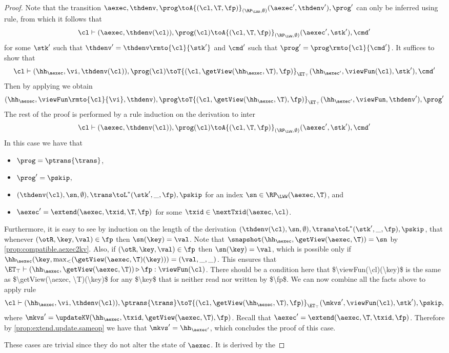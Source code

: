\begin{proof}
Note that the transition 
$\aexec, \thdenv, \prog \toA{(\cl, \T, \fp)}_{(\RP_{\LWW}, \emptyset)} (\aexec', \thdenv'), \prog'$ 
can only be inferred using  rule, 
from which it follows that 
\[
    \cl \vdash (\aexec, \thdenv(\cl)), \prog(\cl) 
    \toA{(\cl, \T, \fp)}_{(\RP_{\LWW}, \emptyset)} (\aexec' ,\stk'), \cmd'
\]
for some $\stk'$ such that $\thdenv' = \thdenv\rmto{\cl}{\stk'}$ 
and $\cmd'$ such that $\prog' = \prog\rmto{\cl}{\cmd'}$.
It suffices to show that 
\[
    \cl \vdash (\hh_\aexec, \vi, \thdenv(\cl)), \prog(\cl) 
   \toT{(\cl, \getView(\hh_{\aexec}, \T), \fp)}_{\ET_{\top}} 
    (\hh_{\aexec'}, \viewFun(\cl), \stk'), \cmd'
\]
Then by applying  we obtain 
\[
    (\hh_{\aexec}, \viewFun\rmto{\cl}{\vi}, \thdenv), \prog 
    \toT{(\cl, \getView(\hh_{\aexec}, \T), \fp)}_{\ET_{\top}} 
    (\hh_{\aexec'}, \viewFun, \thdenv'), \prog'
\]
The rest of the proof is performed by a rule induction on the derivation to inter 
\[ 
    \cl \vdash (\aexec, \thdenv(\cl)), \prog(\cl) 
    \toA{(\cl, \T, \fp)}_{(\RP_{\LWW}, \emptyset)} (\aexec', \stk'), \cmd'
\]
In this case we have that 
\begin{itemize}
    \item $\prog = \ptrans{\trans}$, 
    \item $\prog' = \pskip$, 
    \item $(\thdenv(\cl), \sn, \emptyset), \trans \toL^{\ast} (\stk', \_, \fp), \pskip$ for an index $\sn \in \RP_{\LWW}(\aexec, \T)$, and 
    \item $\aexec' = \extend(\aexec, \txid, \T, \fp)$ for some $\txid \in \nextTxid(\aexec, \cl)$. 
\end{itemize}
Furthermore, it is easy to see by induction on the length of the derivation 
$(\thdenv(\cl), \sn, \emptyset), \trans \toL^{\ast} (\stk', \_, \fp), \pskip$, 
that whenever $(\otR, \key, \val) \in \fp$ then $\sn(\key) = \val$.
Note that $\snapshot(\hh_{\aexec}, \getView(\aexec, \T)) = \sn$ by \cref{prop:compatible.aexec2kv}.
Also, if $(\otR,\key, \val) \in \fp$ then $\sn(\key) = \val$, which is possible only if  
$\hh_{\aexec}(\key, \max_{<}(\getView(\aexec, \T)(\key))) = (\val, \_, \_)$.
This ensures that $\ET_{\top} \vdash (\hh_{\aexec}, \getView(\aexec, \T)) \triangleright \fp: \viewFun(\cl)$. 
\ac{There should be a condition here that $\viewFun(\cl)(\key)$ is the same as $\getView(\aexec, \T)(\key)$ 
for any $\key$ that is neither read nor written by $\fp$.} 
We can now combine all the facts above to apply rule 
\[
    \cl \vdash (\hh_{\aexec}, \vi, \thdenv(\cl)), \ptrans{\trans}
    \toT{(\cl, \getView(\hh_{\aexec}, \T), \fp)}_{\ET_{\top}} 
    (\mkvs', \viewFun(\cl), \stk'), \pskip, 
\] 
where $\mkvs' = \updateKV(\hh_{\aexec}, \txid, \getView(\aexec, \T), \fp)$. 
Recall that $\aexec' = \extend(\aexec, \T, \txid, \fp)$. 
Therefore by \cref{prop:extend.update.sameop} we have that $\mkvs' = \hh_{\aexec'}$, 
which concludes the proof of this case.

These cases are trivial since they do not alter the state of \( \aexec \).
It is derived by the \ih
\end{proof}

